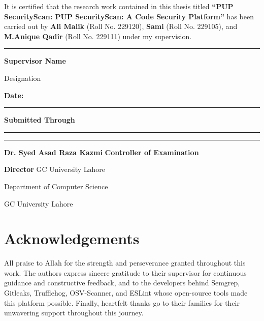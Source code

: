 \documentclass[12pt,a4paper]{report}
\begin{document}
It is certified that the research work contained in this thesis titled \textbf{``PUP SecurityScan:  PUP SecurityScan: A Code Security Platform''} has been carried out by \textbf{Ali Malik} (Roll No. 229120), \textbf{Sami} (Roll No. 229105), and \textbf{M.Anique Qadir} (Roll No. 229111) under my supervision.

\vspace{3cm}

\hfill\rule{5cm}{0.4pt}

\hfill\textbf{Supervisor Name}

\hfill Designation

\vspace{2cm}

\noindent\textbf{Date:} \rule{3cm}{0.4pt}

\vspace{2cm}

\noindent\textbf{Submitted Through}

\vspace{2cm}

\noindent\rule{5cm}{0.4pt} \hfill \rule{5cm}{0.4pt}

\noindent\textbf{Dr. Syed Asad Raza Kazmi} \hfill \textbf{Controller of Examination}

\noindent\textbf{Director} \hfill GC University Lahore

\noindent Department of Computer Science

\noindent GC University Lahore

\chapter*{Acknowledgements}

All praise to Allah for the strength and perseverance granted throughout this work. The authors express sincere gratitude to their supervisor for continuous guidance and constructive feedback, and to the developers behind Semgrep, Gitleaks, Trufflehog, OSV-Scanner, and ESLint whose open-source tools made this platform possible. Finally, heartfelt thanks go to their families for their unwavering support throughout this journey.

\end{document}
